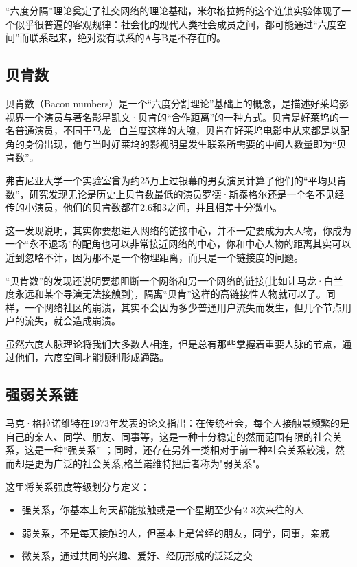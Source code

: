 \documentclass[12pt]{report}
\begin{document}
			“六度分隔”理论奠定了社交网络的理论基础，米尔格拉姆的这个连锁实验体现了一个似乎很普遍的客观规律：社会化的现代人类社会成员之间，都可能通过“六度空间”而联系起来，绝对没有联系的A与B是不存在的。
		
		\subsection{贝肯数}
			
			贝肯数（Bacon numbers）是一个“六度分割理论”基础上的概念，是描述好莱坞影视界一个演员与著名影星凯文·贝肯的“合作距离”的一种方式。贝肯是好莱坞的一名普通演员，不同于马龙·白兰度这样的大腕，贝肯在好莱坞电影中从来都是以配角的身份出现，他与当时好莱坞的影视明星发生联系所需要的中间人数量即为“贝肯数”。
			
			弗吉尼亚大学一个实验室曾为约25万上过银幕的男女演员计算了他们的“平均贝肯数”，研究发现无论是历史上贝肯数最低的演员罗德·斯泰格尔还是一个名不见经传的小演员，他们的贝肯数都在2.6和3之间，并且相差十分微小。
			
			这一发现说明，其实你要想进入网络的链接中心，并不一定要成为大人物，你成为一个“永不退场”的配角也可以非常接近网络的中心，你和中心人物的距离其实可以近到忽略不计，因为那不是一个物理距离，而只是一个链接度的问题。
			
			“贝肯数”的发现还说明要想阻断一个网络和另一个网络的链接(比如让马龙·白兰度永远和某个导演无法接触到)，隔离“贝肯”这样的高链接性人物就可以了。同样，一个网络社区的崩溃，其实不会因为多少普通用户流失而发生，但几个节点用户的流失，就会造成崩溃。
			
			虽然六度人脉理论将我们大多数人相连，但是总有那些掌握着重要人脉的节点，通过他们，六度空间才能顺利形成通路。
			
		\subsection{强弱关系链}
		
			马克·格拉诺维特在1973年发表的论文指出：在传统社会，每个人接触最频繁的是自己的亲人、同学、朋友、同事等，这是一种十分稳定的然而范围有限的社会关系，这是一种“强关系” ；同时，还存在另外一类相对于前一种社会关系较浅，然而却是更为广泛的社会关系,格兰诺维特把后者称为"弱关系"。
			
			这里将关系强度等级划分与定义：
			\begin{itemize}
				\item 强关系，你基本上每天都能接触或是一个星期至少有2-3次来往的人
				\item 弱关系，不是每天接触的人，但基本上是曾经的朋友，同学，同事，亲戚
				\item 微关系，通过共同的兴趣、爱好、经历形成的泛泛之交
			\end{itemize}
		
\end{document}
